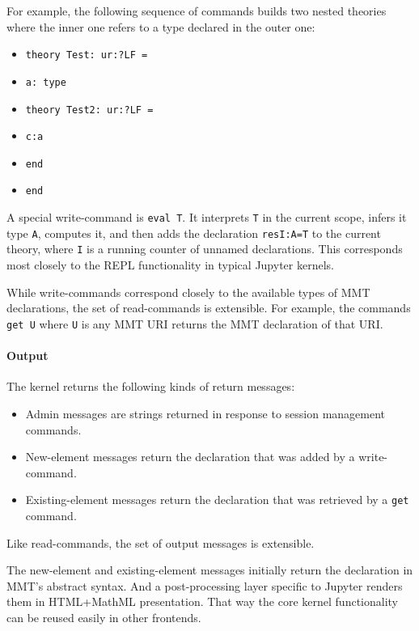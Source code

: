 For example, the following sequence of commands builds two nested theories where the inner one refers to a type declared in the outer one:
\begin{itemize}
\item \texttt{theory Test: ur:?LF =}
\item \texttt{a: type}
\item \texttt{theory Test2: ur:?LF =}
\item \texttt{c:a}
\item \texttt{end}
\item \texttt{end}
\end{itemize}

A special write-command is \texttt{eval T}.
It interprets \texttt{T} in the current scope, infers it type \texttt{A}, computes it, and then adds the declaration \texttt{resI:A=T} to the current theory, where \texttt{I} is a running counter of unnamed declarations.
This corresponds most closely to the REPL functionality in typical Jupyter kernels.

While write-commands correspond closely to the available types of MMT declarations, the set of read-commands is extensible.
For example, the commands \texttt{get U} where \texttt{U} is any MMT URI returns the MMT declaration of that URI.

\paragraph{Output}
The kernel returns the following kinds of return messages:
\begin{itemize}
\item Admin messages are strings returned in response to session management commands.
\item New-element messages return the declaration that was added by a write-command.
\item Existing-element messages return the declaration that was retrieved by a \texttt{get} command.
\end{itemize}
Like read-commands, the set of output messages is extensible.

The new-element and existing-element messages initially return the declaration in MMT's abstract syntax.
And a post-processing layer specific to Jupyter renders them in HTML+MathML presentation.
That way the core kernel functionality can be reused easily in other frontends.

